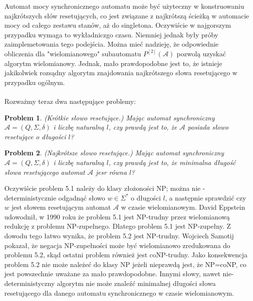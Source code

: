 \documentclass[12pt,a4paper]{article}
\newtheorem{pro}{Problem}[section]
\begin{document}
Automat mocy synchronicznego automatu mo\.ze by\'c u\.zyteczny w konstruowaniu najkr\'otszych s{\l}\'ow resetuj\k{a}cych, co jest zwi\k{a}zane z najkr\'otsz\k{a} \'scie\.zk\k{a} w automacie mocy od ca{\l}ego zestawu stan\'ow, a\.z do singletona. Oczywi\'scie w najgorszym przypadku wymaga to wyk{\l}adniczgo czasu. Niemniej jednak by{\l}y pr\'oby zaimplemetowania tego podej\'scia. Mo\.zna mie\'c nadziej\k{e}, \.ze odpowiednie obliczenia dla "wielomianowego" subautomatu $P^{[2]}(\mathscr{A})$ pozwol\k{a} uzyska\'c algorytm wielomianowy. Jednak, ma{\l}o prawdopodobne jest to, \.ze istnieje jakikolwiek rozs\k{a}dny algorytm znajdowania najkr\'otszego s{\l}owa resetuj\k{a}cego w przypadku og\'olnym.\\ 
\\
Rozwa\.zmy teraz dwa nast\k{e}puj\k{a}ce problemy:

\begin{pro}
(Kr\'otkie s{\l}owo resetuj\k{a}ce.) Maj\k{a}c automat synchroniczny  $\mathscr{A}=(Q, \Sigma, \delta)$ i liczb\k{e} naturaln\k{a} $l$, czy prawd\k{a} jest to, \.ze $\mathscr{A}$ posiada s{\l}owo resetuj\k{a}ce o d{\l}ugo\'sci $l$?
\end{pro}

\begin{pro} (Najkr\'otsze s{\l}owo resetuj\k{a}ce.) Maj\k{a}c automat synchroniczny  $\mathscr{A}=(Q, \Sigma, \delta)$ i liczb\k{e} naturaln\k{a} $l$, czy prawd\k{a} jest to, \.ze minimalna  d{\l}ugo\'s\'c s{\l}owa resetuj\k{a}cego automat $\mathscr{A}$ jesr r\'owna $l$?
\end{pro}

Oczywi\'scie problem 5.1 nale\.zy do klasy z{\l}o\.zono\'sci NP; mo\.zna nie -deterministycznie odgadn\k{a}\'c s{\l}owo $w\in\Sigma^{*}$ o d{\l}ugo\'sci $l$, a nast\k{e}pnie sprawdzi\'c czy $w$ jest s{\l}owem resetuj\k{a}cym automat $\mathscr{A}$ w czasie wielomianowym. David Eppstein udowodni{\l}, w 1990 roku \.ze problem 5.1 jest NP-trudny przez wielomianow\k{a} redukcj\k{e} z problemu NP-zupe{\l}nego. Dlatego problem 5.1 jest NP-zupe{\l}ny. Z dowodu tego {\l}atwo wynika, \.ze problem 5.2 jest NP-trudny. Wojciech Samotij pokaza{\l}, \.ze negacja NP-zupe{\l}no\'sci mo\.ze by\'c wielomianowo zredukowana do problemu 5.2, sk\k{a}d ostatni problem r\'ownie\.z jest coNP-trudny. Jako konsekwencja problem 5.2 nie mo\.ze nale\.ze\'c do klasy NP je\.zeli nieprawd\k{a} jest, \.ze NP=coNP, co jest powszechnie uwa\.zane za ma{\l}o prawdopodobne. Innymi s{\l}owy, nawet nie-deterministyczny algorytm nie mo\.ze znale\'z\'c minimalnej d{\l}ugo\'sci s{\l}owa resetuj\k{a}cego dla danego automatu synchronicznego w czasie wielomianowym.
\end{document}
